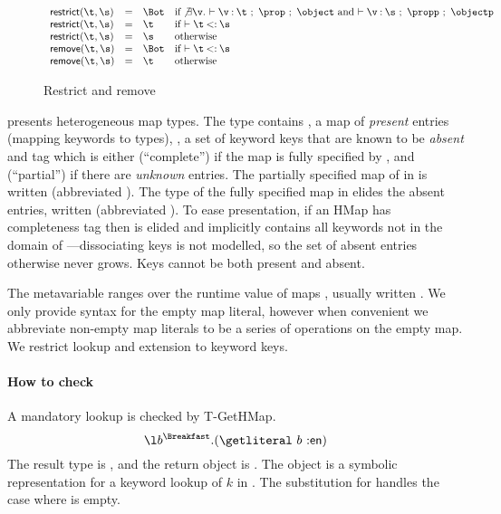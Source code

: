 \begin{figure}
$$
  \begin{array}{llll}
    \restrictfigure{}\\
    \removefigure{}
  \end{array}
$$
\caption{Restrict and remove}
\label{main:figure:restrictremove}
\end{figure}

presents
heterogeneous map types.
The type \HMapgeneric{\mandatory{}}{\absent{}}
contains {\mandatory{}}, a map of \emph{present} entries (mapping keywords to types),
\absent{}, a set of keyword keys that are known to be \emph{absent}
and
tag \completenessmeta{} which is either {\complete{}} (``complete'') if the map is fully specified by \mandatory{},
and {\partial{}} (``partial'') if there are \emph{unknown} entries.
%
The partially specified map of
 in 
is written
(abbreviated \Lunch).
%
The type of the fully specified map
 in  elides the absent entries,
written
(abbreviated \Breakfast).
To ease presentation, 
if an HMap has completeness tag \complete{} then \absent{} is elided and implicitly contains all keywords not in the domain of 
\mandatory{}---dissociating keys is not modelled, so the set of absent entries otherwise
never grows.
Keys cannot be both present and absent.

The metavariable \mapval{}
ranges over the runtime value of maps {\curlymapvaloverright{\kw{}}{\v{}}},
usually written {\curlymapvaloverrightnoarrow{\kw{}}{\v{}}}.
We %
only provide syntax for the empty map literal,
however when convenient we abbreviate non-empty map literals
to be a series of \assocliteral{} operations on the empty map.
We restrict lookup and extension to keyword keys. 

\paragraph{How to check}
A mandatory lookup is checked by T-GetHMap.
$$
\abs{\makelocal{b}}{\Breakfast}{\getexp{\makelocal{b}}{\makekw{en}}}
$$
The result type is \String, and the return object is .
The object { {\object{}} {\x{}}}
is a symbolic representation for a keyword lookup of $k$ in \object{}.
The substitution for {\x{}} handles the case where \object{} is empty.

